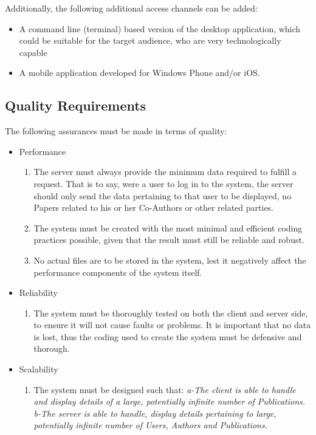 \documentclass[10pt,a4paper]{exam}
\begin{document}
Additionally, the following additional access channels can be added:
	\begin{itemize}
		\item A command line (terminal) based version of the desktop application, which could be suitable for the target audience, who are very technologically capable
		\item A mobile application developed for Windows Phone and/or iOS.
	\end{itemize}
	
\subsection{Quality Requirements}
The following assurances must be made in terms of quality:
	\begin{itemize}
		\item Performance
		\begin{enumerate}
			\item The server must always provide the minimum data required to fulfill a request. That is to say, were a user to log in to the system, the server should only send the data pertaining to that user to be displayed, no Papers related to his or her Co-Authors or other related parties. 
			\item The system must be created with the most minimal and efficient coding practices possible, given that the result must still be reliable and robust.
			\item No actual files are to be stored in the system, lest it negatively affect the performance components of the system itself.
		\end{enumerate}
		\item Reliability
		\begin{enumerate}
			\item The system must be thoroughly tested on both the client and server side, to ensure it will not cause faults or problems. It is important that no data is lost, thus the coding used to create the system must be defensive and thorough.
		\end{enumerate}
		\item Scalability
		\begin{enumerate}
			\item The system must be designed such that:
			\newline
			\textit{	a-The client is able to handle and display details of a large, potentially infinite number of Publications.
				b-The server is able to handle, display details pertaining to large, potentially infinite number of Users, Authors and Publications.}	

\end{enumerate}
\end{itemize}
\end{document}
